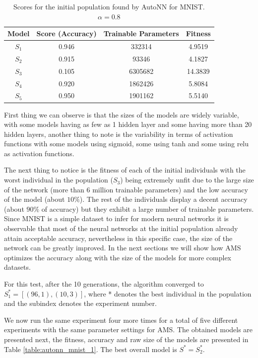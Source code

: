 \documentclass[journal]{IEEEtran}
\begin{document}
\begin{table}[!htb]
\begin{center}
\begin{tabular}{| c | c | c | c |}
\hline
Model & Score (Accuracy) & Trainable Parameters & Fitness\\
\hline
$S_1$ & 0.946 & 332314 & 4.9519\\
$S_2$ & 0.915 & 93346 & 4.1827\\
$S_3$ & 0.105 & 6305682 & 14.3839\\
$S_4$ & 0.920 & 1862426 & 5.8084\\
$S_5$ & 0.950 & 1901162 & 5.5140\\
\hline
\end{tabular}
\end{center}
\caption{Scores for the initial population found by AutoNN for MNIST. $\alpha = 0.8$}
\label{table:autonn_mnist_initial}
\end{table} 

First thing we can observe is that the sizes of the models are widely variable, with some models having as few as 1 hidden layer and some having more than 20 hidden layers, another thing to note is the variability in terms of activation functions with some models using sigmoid, some using tanh and some using relu as activation functions.

The next thing to notice is the fitness of each of the initial individuals with the worst individual in the population ($S_3$) being extremely unfit due to the large size of the network (more than 6 million trainable parameters) and the low accuracy of the model (about $10\%$). The rest of the individuals display a decent accuracy (about $90\%$ of accuracy) but they exhibit a large number of trainable parameters. Since MNIST is a simple dataset to infer for modern neural networks it is observable that most of the neural networks at the initial population already attain acceptable accuracy, nevertheless in this specific case, the size of the network can be greatly improved. In the next sections we will show how AMS optimizes the accuracy along with the size of the models for more complex datasets.

For this test, after the 10 generations, the algorithm converged to $S^*_1 = \left[ (96, 1), (10, 3) \right]$, where * denotes the best individual in the population and the subindex denotes the experiment number.

We now run the same experiment four more times for a total of five different experiments with the same parameter settings for AMS. The obtained models are presented next, the fitness, accuracy and raw size of the models are presented in Table \ref{table:autonn_mnist_1}. The best overall model is $S^* = S^*_2$.
\end{document}
